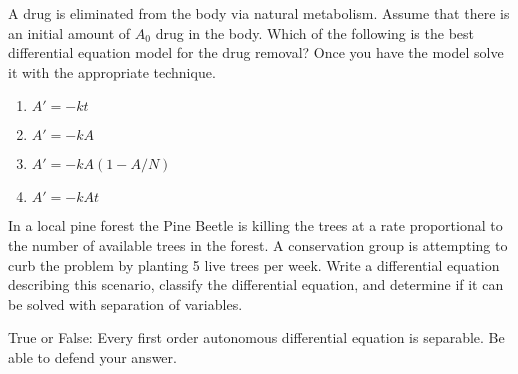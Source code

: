 \begin{problem}
    A drug is eliminated from the body via natural metabolism.  Assume that there is an
    initial amount of $A_0$ drug in the body.  Which of the following is the best
    differential equation model for the drug removal?  Once you have the model solve it
    with the appropriate technique.
    \begin{enumerate}
        \item $A' = -kt$
        \item $A' = -kA$
        \item $A' = -kA(1-A/N)$
        \item $A' = -kAt$
    \end{enumerate}
\end{problem}

\begin{problem}
    In a local pine forest the Pine Beetle is killing the trees at a rate proportional to the
    number of available trees in the forest.  A conservation group is attempting to curb the
    problem by planting 5 live trees per week.  Write a differential equation describing
    this scenario, classify the differential equation, and determine if it can be solved
    with separation of variables.
\end{problem}


\begin{problem}
    True or False: Every first order autonomous differential equation is separable. Be
    able to defend your answer.
\end{problem}


